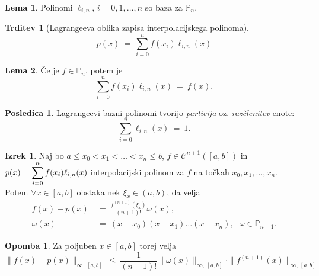 \documentclass[11pt]{article}
\newcommand{\p}{\mathbb{P}}
\newcommand{\C}{\mathcal{C}}
\theoremstyle{definition}
\theoremstyle{definition}
\newtheorem{lema}{Lema}[section]
\newtheorem{trditev}{Trditev}[section]
\newtheorem{izrek}{Izrek}[section]
\newtheorem*{posledica}{Posledica}
\newtheorem*{opomba}{Opomba}
\begin{document}
\begin{lema}

Polinomi $\ell_{i, n}$, $i = 0, 1, \ldots, n$ so baza za $\p_n$.

\end{lema}
\vspace{0.5cm}

\begin{trditev}[Lagrangeeva oblika zapisa interpolacijskega polinoma]

$$p(x) ~=~ \sum_{i=0}^n f(x_i) \ell_{i, n}(x)$$

\end{trditev}
\vspace{0.5cm}

\begin{lema}

Če je $f \in \p_n$, potem je
$$\sum_{i=0}^n f(x_i) \ell_{i, n}(x) ~=~ f(x).$$

\end{lema}
\vspace{0.5cm}

\begin{posledica}

Lagrangeevi bazni polinomi tvorijo \textit{particija} oz. \textit{razčlenitev} enote:
$$\sum_{i=0}^n \ell_{i,n}(x) ~=~ 1.$$

\end{posledica}
\vspace{0.5cm}

\begin{izrek}

Naj bo $a \leq x_0 < x_1 < \ldots < x_n \leq b$, $f \in \C^{n+1}([a, b])$ in \\$p(x) = \mathlarger{\sum_{i=0}^n f(x_i) \ell_{i, n}(x)}$ interpolacijski polinom za $f$ na točkah $x_0, x_1, \ldots, x_n$. Potem $\forall x \in [a, b]$ obstaka nek $\xi_x \in (a, b)$, da velja
\begin{align*}
f(x) - p(x) ~&=~ \frac{f^{(n+1)}(\xi_x)}{(n+1)!} \omega(x), \\
\omega(x) ~&=~ (x-x_0)(x-x_1)\ldots(x-x_n), ~~~\omega \in \p_{n+1}.
\end{align*}

\end{izrek}
\vspace{0.5cm}

\begin{opomba}

Za poljuben $x \in  [a, b]$ torej velja
$$\|f(x) - p(x)\|_{\infty,~[a, b]} ~\leq~ \frac{1}{(n+1)!} \|\omega(x)\|_{\infty,~[a, b]} \cdot \|f^{(n+1)}(x)\|_{\infty,~[a, b]}$$

\end{opomba}
\vspace{0.5cm}
\end{document}
